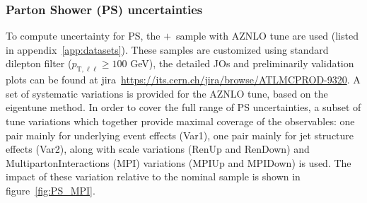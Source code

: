 \subsubsection{Parton Shower (PS) uncertainties}
To compute uncertainty for PS, the \powheg$+$\pythia~sample with AZNLO tune are used (listed in appendix~\ref{app:datasets}). These samples are customized using standard dilepton \pt filter ($p_{\text{T},\ell\ell}\geq100$ GeV), the detailed JOs and preliminarily validation plots can be found at jira~\url{https://its.cern.ch/jira/browse/ATLMCPROD-9320}. A set of systematic variations is provided for the AZNLO tune, based on the eigentune method. In order to cover the full range of PS uncertainties, a subset of tune variations which together provide maximal coverage of the observables: one pair mainly for underlying event effects (Var1), one pair mainly for jet structure effects (Var2), along with scale variations (RenUp and RenDown) and MultipartonInteractions (MPI) variations (MPIUp and MPIDown) is used. The impact of these variation relative to the nominal sample is shown in figure~\ref{fig:PS_MPI}.

